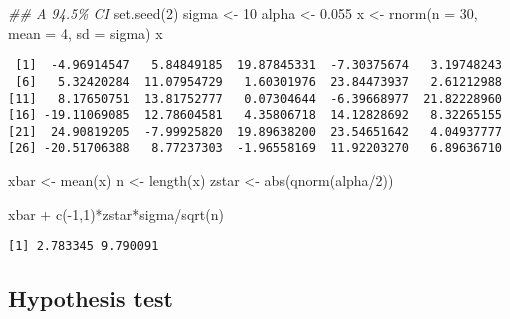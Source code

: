 \documentclass[
  letterpaper,
  DIV=11,
  numbers=noendperiod]{scrreprt}
\newenvironment{Shaded}{\begin{snugshade}}{\end{snugshade}}
\newcommand{\AttributeTok}[1]{\textcolor[rgb]{0.40,0.45,0.13}{#1}}
\newcommand{\DecValTok}[1]{\textcolor[rgb]{0.68,0.00,0.00}{#1}}
\newcommand{\DocumentationTok}[1]{\textcolor[rgb]{0.37,0.37,0.37}{\textit{#1}}}
\newcommand{\FloatTok}[1]{\textcolor[rgb]{0.68,0.00,0.00}{#1}}
\newcommand{\FunctionTok}[1]{\textcolor[rgb]{0.28,0.35,0.67}{#1}}
\newcommand{\NormalTok}[1]{\textcolor[rgb]{0.00,0.23,0.31}{#1}}
\newcommand{\OtherTok}[1]{\textcolor[rgb]{0.00,0.23,0.31}{#1}}
\newcommand{\SpecialCharTok}[1]{\textcolor[rgb]{0.37,0.37,0.37}{#1}}
\begin{document}
\begin{Shaded}
\begin{Highlighting}[]
\DocumentationTok{\#\# A 94.5\% CI}
\FunctionTok{set.seed}\NormalTok{(}\DecValTok{2}\NormalTok{)}
\NormalTok{sigma }\OtherTok{\textless{}{-}} \DecValTok{10}
\NormalTok{alpha }\OtherTok{\textless{}{-}} \FloatTok{0.055}
\NormalTok{x }\OtherTok{\textless{}{-}} \FunctionTok{rnorm}\NormalTok{(}\AttributeTok{n =} \DecValTok{30}\NormalTok{, }\AttributeTok{mean =} \DecValTok{4}\NormalTok{, }\AttributeTok{sd =}\NormalTok{ sigma)}
\NormalTok{x}
\end{Highlighting}
\end{Shaded}

\begin{verbatim}
 [1]  -4.96914547   5.84849185  19.87845331  -7.30375674   3.19748243
 [6]   5.32420284  11.07954729   1.60301976  23.84473937   2.61212988
[11]   8.17650751  13.81752777   0.07304644  -6.39668977  21.82228960
[16] -19.11069085  12.78604581   4.35806718  14.12828692   8.32265155
[21]  24.90819205  -7.99925820  19.89638200  23.54651642   4.04937777
[26] -20.51706388   8.77237303  -1.96558169  11.92203270   6.89636710
\end{verbatim}

\begin{Shaded}
\begin{Highlighting}[]
\NormalTok{xbar }\OtherTok{\textless{}{-}} \FunctionTok{mean}\NormalTok{(x)}
\NormalTok{n }\OtherTok{\textless{}{-}} \FunctionTok{length}\NormalTok{(x)}
\NormalTok{zstar }\OtherTok{\textless{}{-}} \FunctionTok{abs}\NormalTok{(}\FunctionTok{qnorm}\NormalTok{(alpha}\SpecialCharTok{/}\DecValTok{2}\NormalTok{))}

\NormalTok{xbar }\SpecialCharTok{+} \FunctionTok{c}\NormalTok{(}\SpecialCharTok{{-}}\DecValTok{1}\NormalTok{,}\DecValTok{1}\NormalTok{)}\SpecialCharTok{*}\NormalTok{zstar}\SpecialCharTok{*}\NormalTok{sigma}\SpecialCharTok{/}\FunctionTok{sqrt}\NormalTok{(n)}
\end{Highlighting}
\end{Shaded}

\begin{verbatim}
[1] 2.783345 9.790091
\end{verbatim}

\hypertarget{hypothesis-test}{%
\subsection{Hypothesis test}\label{hypothesis-test}}
\end{document}
